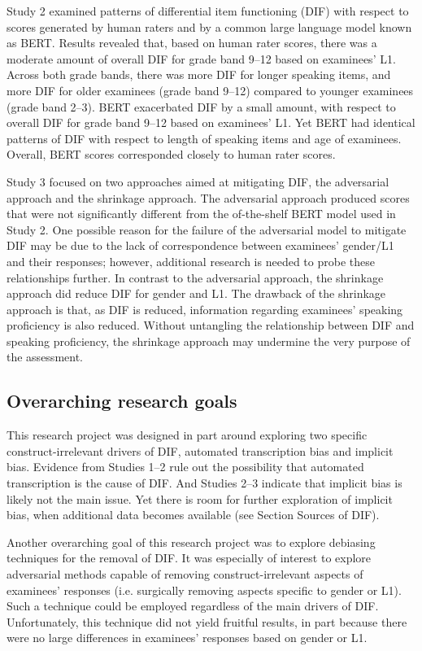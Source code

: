 \documentclass [PhD] {uclathes}
\begin{document}
Study 2 examined patterns of differential item functioning (DIF) with respect to scores generated by human raters and by a common large language model known as BERT. Results revealed that, based on human rater scores, there was a moderate amount of overall DIF for grade band 9–12 based on examinees’ L1. Across both grade bands, there was more DIF for longer speaking items, and more DIF for older examinees (grade band 9–12) compared to younger examinees (grade band 2–3). BERT exacerbated DIF by a small amount, with respect to overall DIF for grade band 9–12 based on examinees’ L1. Yet BERT had identical patterns of DIF with respect to length of speaking items and age of examinees. Overall, BERT scores corresponded closely to human rater scores. 

Study 3 focused on two approaches aimed at mitigating DIF, the adversarial approach and the shrinkage approach. The adversarial approach produced scores that were not significantly different from the of-the-shelf BERT model used in Study 2. One possible reason for the failure of the adversarial model to mitigate DIF may be due to the lack of correspondence between examinees’ gender/L1 and their responses; however, additional research is needed to probe these relationships further. In contrast to the adversarial approach, the shrinkage approach did reduce DIF for gender and L1. The drawback of the shrinkage approach is that, as DIF is reduced, information regarding examinees’ speaking proficiency is also reduced. Without untangling the relationship between DIF and speaking proficiency, the shrinkage approach may undermine the very purpose of the assessment. 

\subsection{Overarching research goals}

This research project was designed in part around exploring two specific construct-irrelevant drivers of DIF, automated transcription bias and implicit bias. Evidence from Studies 1–2 rule out the possibility that automated transcription is the cause of DIF. And Studies 2–3 indicate that implicit bias is likely not the main issue. Yet there is room for further exploration of implicit bias, when additional data becomes available (see Section Sources of DIF). 

Another overarching goal of this research project was to explore debiasing techniques for the removal of DIF. It was especially of interest to explore adversarial methods capable of removing construct-irrelevant aspects of examinees’ responses (i.e. surgically removing aspects specific to gender or L1). Such a technique could be employed regardless of the main drivers of DIF. Unfortunately, this technique did not yield fruitful results, in part because there were no large differences in examinees’ responses based on gender or L1. 
\end{document}
